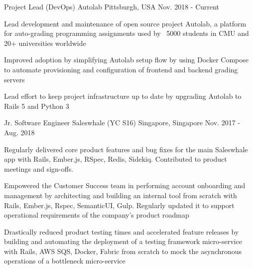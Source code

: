 \begin{cventries}
  \cventry
  {Project Lead (DevOps)} %
    {Autolab} %
    {Pittsburgh, USA} %
    {Nov. 2018 - Current} %
    {
      \begin{cvitems} %
        \item {Lead development and maintenance of open source project Autolab, a platform for auto-grading programming assignments used by ~5000 students in CMU and 20+ universities worldwide}
        \item {Improved adoption by simplifying Autolab setup flow by using Docker Compose to automate provisioning and configuration of frontend and backend grading servers}
        \item {Lead effort to keep project infrastructure up to date by upgrading Autolab to Rails 5 and Python 3}
      \end{cvitems}
    }

  \cventry
    {Jr. Software Engineer} %
    {Saleswhale (YC S16)} %
    {Singapore, Singapore} %
    {Nov. 2017 - Aug. 2018} %
    {
      \begin{cvitems} %
      \item { Regularly delivered core product features and bug fixes for the main Saleswhale app with Rails, Ember.js, RSpec, Redis, Sidekiq. Contributed to product meetings and sign-offs.}
      \item { Empowered the Customer Success team in performing account onboarding and management by architecting and building an internal tool from scratch with Rails, Ember.js, Rspec, SemanticUI, Gulp. Regularly updated it to support operational requirements of the company's product roadmap}
      \item { Drastically reduced product testing times and accelerated feature releases by building and automating the deployment of a testing framework micro-service with Rails, AWS SQS, Docker, Fabric from scratch to mock the asynchronous operations of a bottleneck micro-service}
      \end{cvitems}
    }


\end{cventries}
